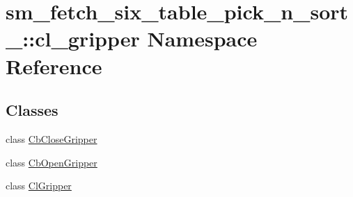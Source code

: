 \hypertarget{namespacesm__fetch__six__table__pick__n__sort__1_1_1cl__gripper}{}\section{sm\+\_\+fetch\+\_\+six\+\_\+table\+\_\+pick\+\_\+n\+\_\+sort\+\_\+:\+:cl\+\_\+gripper Namespace Reference}
\label{namespacesm__fetch__six__table__pick__n__sort__1_1_1cl__gripper}
\subsection*{Classes}
\begin{DoxyCompactItemize}
\item 
class \hyperlink{classsm__fetch__six__table__pick__n__sort__1_1_1cl__gripper_1_1CbCloseGripper}{Cb\+Close\+Gripper}
\item 
class \hyperlink{classsm__fetch__six__table__pick__n__sort__1_1_1cl__gripper_1_1CbOpenGripper}{Cb\+Open\+Gripper}
\item 
class \hyperlink{classsm__fetch__six__table__pick__n__sort__1_1_1cl__gripper_1_1ClGripper}{Cl\+Gripper}
\end{DoxyCompactItemize}
